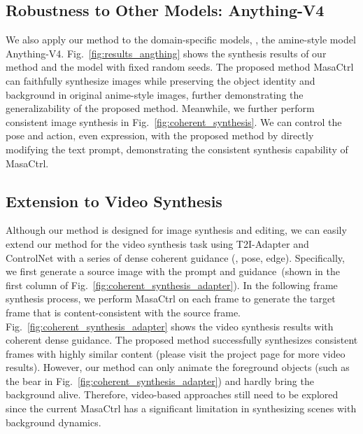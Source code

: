 \documentclass[10pt,twocolumn,letterpaper]{article}
\begin{document}
\subsection{Robustness to Other Models: Anything-V4}

We also apply our method to the domain-specific models, \ie, the amine-style model Anything-V4. Fig.~\ref{fig:results_angthing} shows the synthesis results of our method and the model with fixed random seeds. The proposed method MasaCtrl can faithfully synthesize images while preserving the object identity and background in original anime-style images, further demonstrating the generalizability of the proposed method. 
Meanwhile, we further perform consistent image synthesis in Fig.~\ref{fig:coherent_synthesis}. We can control the pose and action, even expression, with the proposed method by directly modifying the text prompt, demonstrating the consistent synthesis capability of MasaCtrl.

\subsection{Extension to Video Synthesis}
Although our method is designed for image synthesis and editing,
we can easily extend our method for the video synthesis task using T2I-Adapter and ControlNet with a series of dense coherent guidance (\eg, pose, edge). Specifically, we first generate a source image with the prompt  and guidance~(shown in the first column of Fig.~\ref{fig:coherent_synthesis_adapter}). In the following frame synthesis process, we perform MasaCtrl on each frame to generate the target frame that is content-consistent with the source frame. Fig.~\ref{fig:coherent_synthesis_adapter} shows the video synthesis results with coherent dense guidance. The proposed method successfully synthesizes consistent frames with highly similar content (please visit the project page for more video results). However, our method can only animate the foreground objects (such as the bear in Fig.~\ref{fig:coherent_synthesis_adapter}) and hardly bring the background alive. Therefore, video-based approaches still need to be explored since the current MasaCtrl has a significant limitation in synthesizing scenes with background dynamics.
\end{document}
